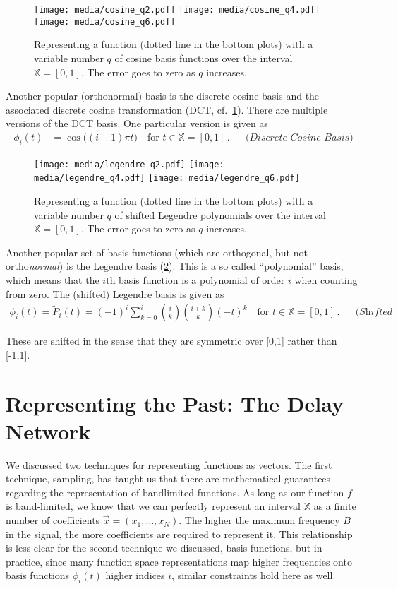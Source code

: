 \documentclass[10pt,letterpaper,oneside]{article}
\begin{document}
\begin{figure}[p]
	\centering
	\texttt{[image: media/cosine\_q2.pdf]}
	\texttt{[image: media/cosine\_q4.pdf]}
	\texttt{[image: media/cosine\_q6.pdf]}
	\caption{Representing a function (dotted line in the bottom plots) with a variable number $q$ of cosine basis functions over the interval $\mathbb{X} = [0, 1]$. The error goes to zero as $q$ increases.}
	\label{fig:cosine}
\end{figure}
Another popular (orthonormal) basis is the discrete cosine basis and the associated discrete cosine transformation (DCT, cf.~\cref{fig:cosine}). There are multiple versions of the DCT basis. One particular version is given as
\begin{align*}
	\phi_i(t) &= \cos\big( (i - 1) \pi t \big) \quad \text{for } t \in \mathbb{X} = [0, 1] \,. && \textit{(Discrete Cosine Basis)}
\end{align*}

\begin{figure}[p]
	\centering
	\texttt{[image: media/legendre\_q2.pdf]}
	\texttt{[image: media/legendre\_q4.pdf]}
	\texttt{[image: media/legendre\_q6.pdf]}
	\caption{Representing a function (dotted line in the bottom plots) with a variable number $q$ of shifted Legendre polynomials over the interval $\mathbb{X} = [0, 1]$. The error goes to zero as $q$ increases.}
	\label{fig:legendre}
\end{figure}
Another popular set of basis functions (which are orthogonal, but not ortho\emph{normal}) is the Legendre basis (\cref{fig:legendre}). This is a so called \enquote{polynomial} basis, which means that the $i$th basis function is a polynomial of order $i$ when counting from zero. The (shifted) Legendre basis is given as
\begin{align}
	\phi_i(t) = \tilde P_i(t) = (-1)^{i} \sum_{k=0}^{i} \binom{i}{k} \binom{i + k}{k} (-t)^{k} \quad \text{for } t \in \mathbb{X} = [0, 1]\,. && \textit{(Shifted Legendre Basis)}
	\label{eqn:legendre}
\end{align}

These are shifted in the sense that they are symmetric over [0,1] rather than [-1,1].

\section{Representing the Past: The Delay Network}

We discussed two techniques for representing functions as vectors. The first technique, sampling, has taught us that there are mathematical guarantees regarding the representation of bandlimited functions. As long as our function $f$ is band-limited, we know that we can perfectly represent an interval $\mathbb{X}$ as a finite number of coefficients $\vec x = (x_1, \ldots, x_N)$. The higher the maximum frequency $B$ in the signal, the more coefficients are required to represent it. This relationship is less clear for the second technique we discussed, basis functions, but in practice, since many function space representations map higher frequencies onto basis functions $\phi_i(t)$ higher indices $i$, similar constraints hold here as well.
\end{document}
